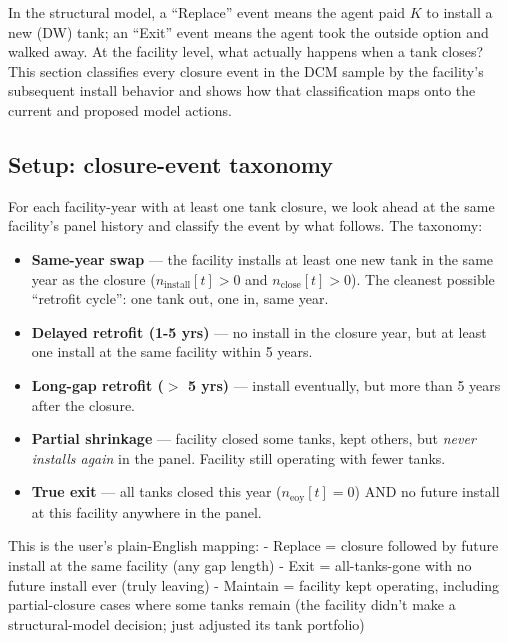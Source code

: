 \documentclass[
  11pt,
]{article}
\providecommand{\tightlist}{%
  \setlength{\itemsep}{0pt}\setlength{\parskip}{0pt}}\usepackage{longtable,booktabs,array}
\begin{document}
In the structural model, a ``Replace'' event means the agent paid \(K\)
to install a new (DW) tank; an ``Exit'' event means the agent took the
outside option and walked away. At the facility level, what actually
happens when a tank closes? This section classifies every closure event
in the DCM sample by the facility's subsequent install behavior and
shows how that classification maps onto the current and proposed model
actions.

\subsection{Setup: closure-event taxonomy}\label{sec-closure-setup}

For each facility-year with at least one tank closure, we look ahead at
the same facility's panel history and classify the event by what
follows. The taxonomy:

\begin{itemize}
\tightlist
\item
  \textbf{Same-year swap} --- the facility installs at least one new
  tank in the same year as the closure (\(n_{\text{install}}[t] > 0\)
  and \(n_{\text{close}}[t] > 0\)). The cleanest possible ``retrofit
  cycle'': one tank out, one in, same year.
\item
  \textbf{Delayed retrofit (1-5 yrs)} --- no install in the closure
  year, but at least one install at the same facility within 5 years.
\item
  \textbf{Long-gap retrofit (\(>\) 5 yrs)} --- install eventually, but
  more than 5 years after the closure.
\item
  \textbf{Partial shrinkage} --- facility closed some tanks, kept
  others, but \emph{never installs again} in the panel. Facility still
  operating with fewer tanks.
\item
  \textbf{True exit} --- all tanks closed this year
  (\(n_{\text{eoy}}[t] = 0\)) AND no future install at this facility
  anywhere in the panel.
\end{itemize}

This is the user's plain-English mapping: - Replace = closure followed
by future install at the same facility (any gap length) - Exit =
all-tanks-gone with no future install ever (truly leaving) - Maintain =
facility kept operating, including partial-closure cases where some
tanks remain (the facility didn't make a structural-model decision; just
adjusted its tank portfolio)
\end{document}
